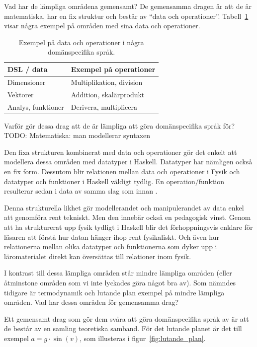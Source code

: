 \begin{binge}
Vad har de lämpliga områdena gemensamt? De gemensamma dragen är att de är
matematiska, har en fix struktur och består av ``data och operationer''.
Tabell~\ref{tab:data_och_ops} visar några exempel på områden med sina data och
operationer.

\begin{table}[tph]
\centering
\caption{Exempel på data och operationer i några domänspecifika språk.}
\label{tab:data_och_ops}
\begin{tabular}{@{}l|l@{}}
\toprule
DSL / data & Exempel på operationer \\ \midrule
Dimensioner & Multiplikation, division \\
Vektorer & Addition, skalärprodukt \\
Analys, funktioner & Derivera, multiplicera \\ \bottomrule
\end{tabular}
\end{table}

Varför gör dessa drag att de är lämpliga att göra domänspecifika språk för?
TODO: Matematiska: man modellerar syntaxen

Den fixa strukturen kombinerat med data och operationer gör det enkelt att
modellera dessa områden med datatyper i Haskell. Datatyper har nämligen också en
fix form. Dessutom blir relationen mellan data och operationer i Fysik och
datatyper och funktioner i Haskell väldigt tydlig. En operation/funktion
resulterar sedan i data av samma slag som innan .

Denna strukturella likhet gör modellerandet och manipulerandet av data enkel att
genomföra rent tekniskt. Men den innebär också en pedagogisk vinst. Genom att ha
strukturerat upp fysik tydligt i Haskell blir det förhoppningsvis enklare för
läsaren att förstå hur datan hänger ihop rent fysikaliskt. Och även hur
relationerna mellan olika datatyper och funktionerna som dyker upp i
läromaterialet direkt kan översättas till relationer inom fysik.

I kontrast till dessa lämpliga områden står mindre lämpliga områden (eller
åtminstone områden som vi inte lyckades göra något bra av). Som nämndes tidigare
är termodynamik och lutande plan exempel på mindre lämpliga områden. Vad har
dessa områden för gemensamma drag?

Ett gemensamt drag som gör dem svåra att göra domänspecifika språk av är att de
består av en samling teoretiska samband. För det lutande planet är det till
exempel $a = g \cdot \sin(v)$, som illusteras i figur~\ref{fig:lutande_plan}.


\end{binge}
